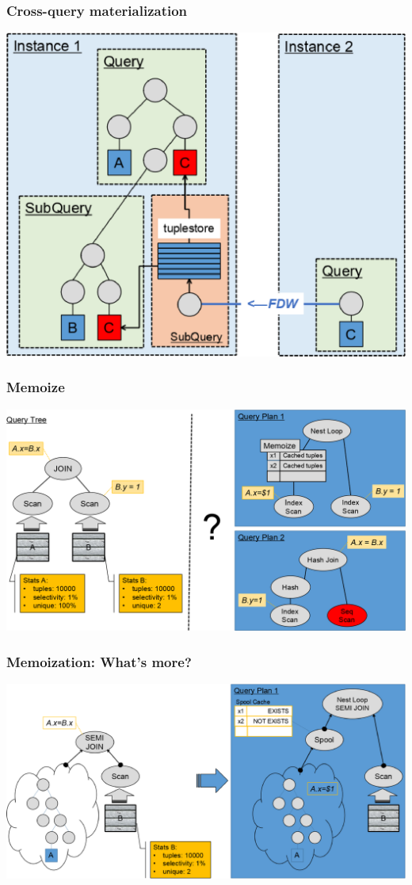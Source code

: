 \documentclass{beamer}
\begin{document}
\begin{frame}\frametitle{Cross-query materialization}
	\includegraphics[scale=0.5]{pics/tee}
\end{frame}

\begin{frame}\frametitle{Memoize}
  \includegraphics[scale=0.33]{pics/memoize.png}
\end{frame}

\begin{frame}\frametitle{Memoization: What's more?}
\hspace*{\fill}
	\includegraphics[scale=0.35]{pics/spool}
\hspace*{\fill}
\end{frame}
\end{document}
